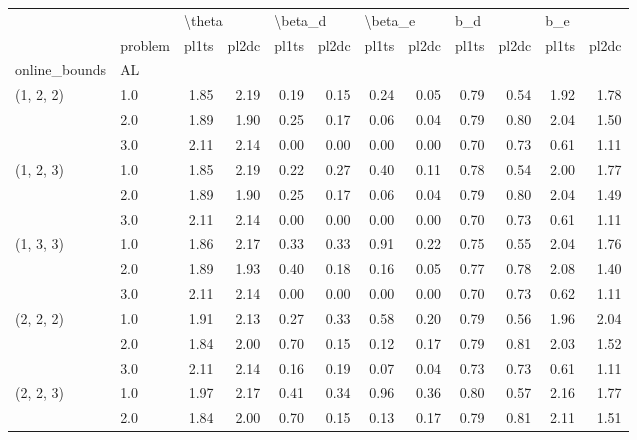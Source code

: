 \begin{tabular}{llrrrrrrrrrr}
\toprule
          & {} & \multicolumn{2}{l}{\textbackslash theta} & \multicolumn{2}{l}{\textbackslash beta\_d} & \multicolumn{2}{l}{\textbackslash beta\_e} & \multicolumn{2}{l}{b\_d} & \multicolumn{2}{l}{b\_e} \\
          & problem &  pl1ts & pl2dc &   pl1ts & pl2dc &   pl1ts & pl2dc & pl1ts & pl2dc & pl1ts & pl2dc \\
online\_bounds & AL &        &       &         &       &         &       &       &       &       &       \\
\midrule
(1, 2, 2) & 1.0 &   1.85 &  2.19 &    0.19 &  0.15 &    0.24 &  0.05 &  0.79 &  0.54 &  1.92 &  1.78 \\
          & 2.0 &   1.89 &  1.90 &    0.25 &  0.17 &    0.06 &  0.04 &  0.79 &  0.80 &  2.04 &  1.50 \\
          & 3.0 &   2.11 &  2.14 &    0.00 &  0.00 &    0.00 &  0.00 &  0.70 &  0.73 &  0.61 &  1.11 \\
(1, 2, 3) & 1.0 &   1.85 &  2.19 &    0.22 &  0.27 &    0.40 &  0.11 &  0.78 &  0.54 &  2.00 &  1.77 \\
          & 2.0 &   1.89 &  1.90 &    0.25 &  0.17 &    0.06 &  0.04 &  0.79 &  0.80 &  2.04 &  1.49 \\
          & 3.0 &   2.11 &  2.14 &    0.00 &  0.00 &    0.00 &  0.00 &  0.70 &  0.73 &  0.61 &  1.11 \\
(1, 3, 3) & 1.0 &   1.86 &  2.17 &    0.33 &  0.33 &    0.91 &  0.22 &  0.75 &  0.55 &  2.04 &  1.76 \\
          & 2.0 &   1.89 &  1.93 &    0.40 &  0.18 &    0.16 &  0.05 &  0.77 &  0.78 &  2.08 &  1.40 \\
          & 3.0 &   2.11 &  2.14 &    0.00 &  0.00 &    0.00 &  0.00 &  0.70 &  0.73 &  0.62 &  1.11 \\
(2, 2, 2) & 1.0 &   1.91 &  2.13 &    0.27 &  0.33 &    0.58 &  0.20 &  0.79 &  0.56 &  1.96 &  2.04 \\
          & 2.0 &   1.84 &  2.00 &    0.70 &  0.15 &    0.12 &  0.17 &  0.79 &  0.81 &  2.03 &  1.52 \\
          & 3.0 &   2.11 &  2.14 &    0.16 &  0.19 &    0.07 &  0.04 &  0.73 &  0.73 &  0.61 &  1.11 \\
(2, 2, 3) & 1.0 &   1.97 &  2.17 &    0.41 &  0.34 &    0.96 &  0.36 &  0.80 &  0.57 &  2.16 &  1.77 \\
          & 2.0 &   1.84 &  2.00 &    0.70 &  0.15 &    0.13 &  0.17 &  0.79 &  0.81 &  2.11 &  1.51 \\

\end{tabular}
